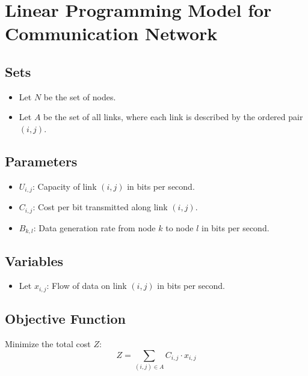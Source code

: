 \documentclass{article}
\begin{document}
\section*{Linear Programming Model for Communication Network}

\subsection*{Sets}
\begin{itemize}
    \item Let \( N \) be the set of nodes.
    \item Let \( A \) be the set of all links, where each link is described by the ordered pair \( (i,j) \).
\end{itemize}

\subsection*{Parameters}
\begin{itemize}
    \item \( U_{i,j} \): Capacity of link \( (i,j) \) in bits per second.
    \item \( C_{i,j} \): Cost per bit transmitted along link \( (i,j) \).
    \item \( B_{k,l} \): Data generation rate from node \( k \) to node \( l \) in bits per second.
\end{itemize}

\subsection*{Variables}
\begin{itemize}
    \item Let \( x_{i,j} \): Flow of data on link \( (i,j) \) in bits per second.
\end{itemize}

\subsection*{Objective Function}
Minimize the total cost \( Z \):
\[
Z = \sum_{(i,j) \in A} C_{i,j} \cdot x_{i,j}
\]
\end{document}
